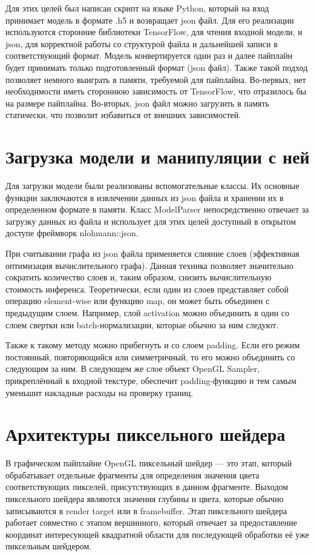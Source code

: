 \documentclass[a4paper,14pt]{extreport}
\begin{document}
            Для этих целей был написан скрипт на языке Python, который на вход принимает модель в формате .h5 и возвращает json файл. Для его реализации используются сторонние библиотеки TensorFlow, для чтения входной модели, и json, для корректной работы со структурой файла и дальнейшей записи в соответствующий формат. Модель конвертируется один раз и далее пайплайн будет принимать только подготовленный формат (json файл). Также такой подход позволяет немного выиграть в памяти, требуемой для пайплайна. Во-первых, нет необходимости иметь стороннюю зависимость от TensorFlow, что отразилось бы на размере пайплайна. Во-вторых, json файл можно загрузить в память статически, что позволит избавиться от внешних зависимостей.
            
        \section{Загрузка модели и манипуляции с ней}
            Для загрузки модели были реализованы вспомогательные классы. Их основные функции заключаются в извлечении данных из json файла и хранении их в определенном формате в памяти. Класс ModelParser непосредственно отвечает за загрузку данных из файла и использует для этих целей доступный в открытом доступе фреймворк nlohmann::json. 

            При считывании графа из json файла применяется слияние слоев (эффективная оптимизация вычислительного графа). Данная техника позволяет значительно сократить количество слоев и, таким образом, снизить вычислительную стоимость инференса. Теоретически, если один из слоев представляет собой операцию element-wise или функцию map, он может быть объединен с предыдущим слоем. Например, слой activation можно объединить в один со слоем свертки или batch-нормализации, которые обычно за ним следуют.
            
            Также к такому методу можно прибегнуть и со слоем padding. Если его режим постоянный, повторяющийся или симметричный, то его можно объединить со следующим за ним. В следующем же слое объект OpenGL Sampler, прикреплённый к входной текстуре, обеспечит padding-функцию и тем самым уменьшит накладные расходы на проверку границ.

        \section{Архитектуры пиксельного шейдера}
            В графическом пайплайне OpenGL пиксельный шейдер — это этап, который обрабатывает отдельные фрагменты для определения значения цвета соответствующих пикселей, присутствующих в данном фрагменте. Выходом пиксельного шейдера являются значения глубины и цвета, которые обычно записываются в render target или в framebuffer. Этап пиксельного шейдера работает совместно с этапом вершинного, который отвечает за предоставление координат интересующей квадратной области для последующей обработки её уже пиксельным шейдером.
\end{document}

